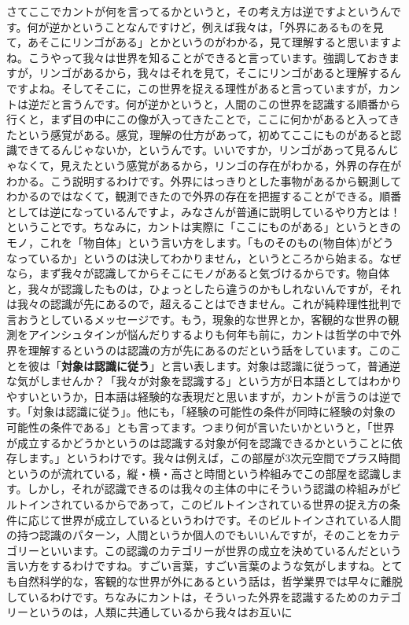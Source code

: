 \documentclass{ltjsbook}
\begin{document}
さてここでカントが何を言ってるかというと，その考え方は逆ですよというんです。何が逆かということなんですけど，例えば我々は，「外界にあるものを見て，あそこにリンゴがある」とかというのがわかる，見て理解すると思いますよね。こうやって我々は世界を知ることができると言っています。強調しておきますが，リンゴがあるから，我々はそれを見て，そこにリンゴがあると理解するんですよね。そしてそこに，この世界を捉える理性があると言っていますが，カントは逆だと言うんです。何が逆かというと，人間のこの世界を認識する順番から行くと，まず目の中にこの像が入ってきたことで，ここに何かがあると入ってきたという感覚がある。感覚，理解の仕方があって，初めてここにものがあると認識できてるんじゃないか，というんです。いいですか，リンゴがあって見るんじゃなくて，見えたという感覚があるから，リンゴの存在がわかる，外界の存在がわかる。こう説明するわけです。外界にはっきりとした事物があるから観測してわかるのではなくて，観測できたので外界の存在を把握することができる。順番としては逆になっているんですよ，みなさんが普通に説明しているやり方とは！ということです。ちなみに，カントは実際に「ここにものがある」というときのモノ，これを「物自体」という言い方をします。「ものそのもの(物自体)がどうなっているか」というのは決してわかりません，というところから始まる。なぜなら，まず我々が認識してからそこにモノがあると気づけるからです。物自体と，我々が認識したものは，ひょっとしたら違うのかもしれないんですが，それは我々の認識が先にあるので，超えることはできません。これが純粋理性批判で言おうとしているメッセージです。もう，現象的な世界とか，客観的な世界の観測をアインシュタインが悩んだりするよりも何年も前に，カントは哲学の中で外界を理解するというのは認識の方が先にあるのだという話をしています。このことを彼は「\textbf{対象は認識に従う}」と言い表します。対象は認識に従うって，普通逆な気がしませんか？「我々が対象を認識する」という方が日本語としてはわかりやすいというか，日本語は経験的な表現だと思いますが，カントが言うのは逆です。「対象は認識に従う」。他にも，「経験の可能性の条件が同時に経験の対象の可能性の条件である」とも言ってます。つまり何が言いたいかというと，「世界が成立するかどうかというのは認識する対象が何を認識できるかということに依存します。」というわけです。我々は例えば，この部屋が3次元空間でプラス時間というのが流れている，縦・横・高さと時間という枠組みでこの部屋を認識します。しかし，それが認識できるのは我々の主体の中にそういう認識の枠組みがビルトインされているからであって，このビルトインされている世界の捉え方の条件に応じて世界が成立しているというわけです。そのビルトインされている人間の持つ認識のパターン，人間というか個人のでもいいんですが，そのことをカテゴリーといいます。この認識のカテゴリーが世界の成立を決めているんだという言い方をするわけですね。すごい言葉，すごい言葉のような気がしますね。とても自然科学的な，客観的な世界が外にあるという話は，哲学業界では早々に離脱しているわけです。ちなみにカントは，そういった外界を認識するためのカテゴリーというのは，人類に共通しているから我々はお互いに
\end{document}
